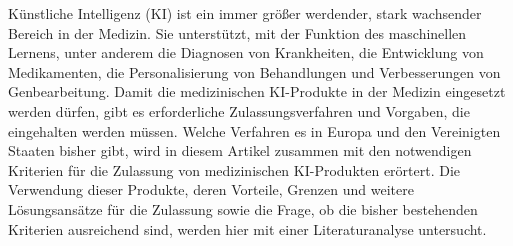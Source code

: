 Künstliche Intelligenz (KI) ist ein immer größer werdender, stark wachsender Bereich in der Medizin. Sie unterstützt, mit der Funktion des maschinellen Lernens, unter anderem die Diagnosen von Krankheiten, die Entwicklung von Medikamenten, die Personalisierung von Behandlungen und Verbesserungen von Genbearbeitung.
Damit die medizinischen KI-Produkte in der Medizin eingesetzt werden dürfen, gibt es erforderliche Zulassungsverfahren und Vorgaben, die eingehalten werden müssen.
Welche Verfahren es in Europa und den Vereinigten Staaten bisher gibt, wird in diesem Artikel zusammen mit den notwendigen Kriterien für die Zulassung von medizinischen KI-Produkten erörtert. Die Verwendung dieser Produkte, deren Vorteile, Grenzen und weitere Lösungsansätze für die Zulassung sowie die Frage, ob die bisher bestehenden Kriterien ausreichend sind, werden hier mit einer Literaturanalyse untersucht.
